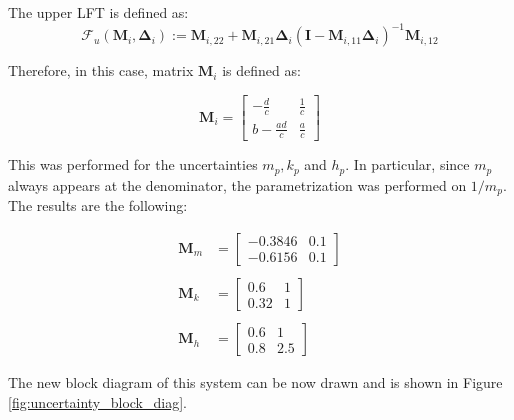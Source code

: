 \documentclass{scrreprt}
\begin{document}
The upper LFT is defined as:
\begin{equation}
    \mathcal{F}_u(\boldsymbol{M}_i, \boldsymbol{\Delta}_i) := \boldsymbol{M}_{i,22} + \boldsymbol{M}_{i,21}\boldsymbol{\Delta}_i(\boldsymbol{I} - \boldsymbol{M}_{i,11}\boldsymbol{\Delta}_i)^{-1}\boldsymbol{M}_{i,12}
\end{equation}

Therefore, in this case, matrix $\boldsymbol{M}_i$ is defined as:

\begin{equation}
    \boldsymbol{M}_i = \begin{bmatrix}
        -\frac{d}{c} & \frac{1}{c} \\
        b-\frac{ad}{c} & \frac{a}{c}
    \end{bmatrix}
\end{equation}

This was performed for the uncertainties $m_p, k_p$ and $h_p$. In particular, since $m_p$ always appears at the denominator, the parametrization was performed on $1/m_p$. The results are the following:

\begin{equation}
    \begin{aligned}
        \boldsymbol{M}_m &= \begin{bmatrix} -0.3846 & 0.1 \\ -0.6156 & 0.1 \end{bmatrix} \\
        \\
        \boldsymbol{M}_k &= \begin{bmatrix} 0.6 & 1 \\ 0.32 & 1 \end{bmatrix} \\
        \\
        \boldsymbol{M}_h &= \begin{bmatrix} 0.6 & 1 \\ 0.8 & 2.5 \end{bmatrix}
    \end{aligned}
\end{equation}

The new block diagram of this system can be now drawn and is shown in Figure \ref{fig:uncertainty_block_diag}.
\end{document}
